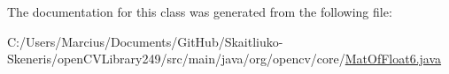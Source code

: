 The documentation for this class was generated from the following file\+:\begin{DoxyCompactItemize}
\item 
C\+:/\+Users/\+Marcius/\+Documents/\+Git\+Hub/\+Skaitliuko-\/\+Skeneris/open\+C\+V\+Library249/src/main/java/org/opencv/core/\mbox{\hyperlink{_mat_of_float6_8java}{Mat\+Of\+Float6.\+java}}\end{DoxyCompactItemize}
